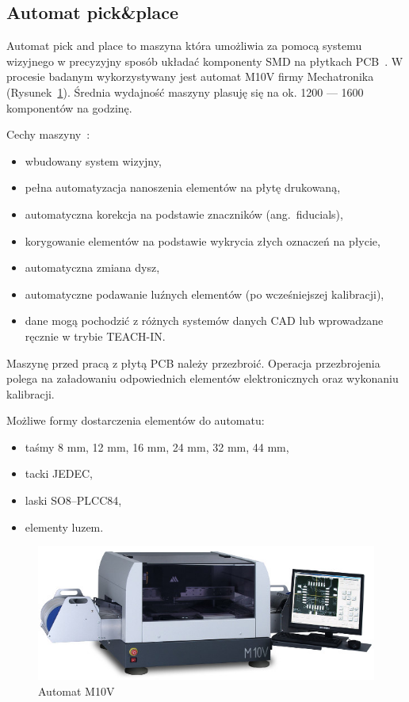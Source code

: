 \subsection{Automat pick\&place}
Automat pick and place to maszyna która umożliwia za pomocą systemu wizyjnego w precyzyjny sposób układać komponenty SMD na płytkach PCB~\cite{automatp&p1}. W procesie badanym wykorzystywany jest automat M10V firmy Mechatronika (Rysunek~\ref{automat_pick_place}). Średnia wydajność maszyny plasuję się na ok. 1200 --- 1600 komponentów na godzinę.

Cechy maszyny~\cite{automatp&p2}:
\begin{itemize}
	\item wbudowany system wizyjny,
	\item pełna automatyzacja nanoszenia elementów na płytę drukowaną,
	\item automatyczna korekcja na podstawie znaczników (ang.\ fiducials),
	\item korygowanie elementów na podstawie wykrycia złych oznaczeń na płycie,
	\item automatyczna zmiana dysz,
	\item automatyczne podawanie luźnych elementów (po wcześniejszej kalibracji),
	\item dane mogą pochodzić z różnych systemów danych CAD lub wprowadzane ręcznie w trybie TEACH-IN\@.
\end{itemize}

\newpage
Maszynę przed pracą z płytą PCB należy przezbroić. Operacja przezbrojenia polega na załadowaniu odpowiednich elementów elektronicznych oraz wykonaniu kalibracji.

Możliwe formy dostarczenia elementów do automatu:
\begin{itemize}
	\item taśmy 8 mm, 12 mm, 16 mm, 24 mm, 32 mm, 44 mm,
	\item tacki JEDEC,
	\item laski SO8–PLCC84,
	\item elementy luzem.
\end{itemize}

\begin{figure}[H]
	\centering
	\includegraphics[scale=0.45]{./chapters/chapter2/M10V.jpeg}
	\caption{Automat M10V~\cite{automatp&p2}}
	\label{automat_pick_place}
\end{figure}



